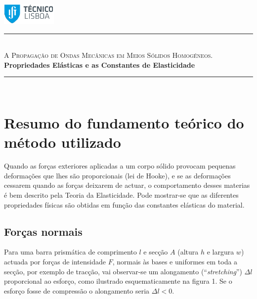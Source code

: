 \documentclass[a4paper,12pt]{article}
\author{Prof. Bernardo B. Carvalho}
\date{ Setembro 2017}
\newcommand{\HRule}{\rule{\linewidth}{0.5mm}}
\begin{document}
 

	\includegraphics[width=0.2\textwidth]{../../logo-ist}%

	\HRule \\[0.5cm]
	{ \huge \sf  \textsc{A Propagação de Ondas Mecânicas em Meios Sólidos Homogéneos.}} \\[0.4cm] %
	{ \large \bfseries Propriedades Elásticas e as Constantes de Elasticidade}\\
	\HRule \\%

\section{\sf Resumo do fundamento teórico do método utilizado}
Quando as forças exteriores aplicadas a um corpo sólido provocam pequenas deformações que lhes são proporcionais (lei de Hooke), e se as deformações cessarem quando as forças deixarem de actuar, o comportamento desses materias é bem descrito pela Teoria da Elasticidade. Pode mostrar-se que as diferentes propriedades físicas são obtidas em função das constantes elásticas do material.

\subsection{\sf Forças normais }

Para uma barra prismática de comprimento $l$ e secção $A$ (altura $h$ e largura $w$) actuada por forças de intensidade $F$, normais às bases e uniformes em toda a secção, por exemplo de tracção, vai observar-se um alongamento (“\emph{stretching}”) $\Delta l$ proporcional ao esforço, como ilustrado esquematicamente na figura 1. Se o esforço fosse de compressão o alongamento seria $\Delta l<0$. 
\end{document}
